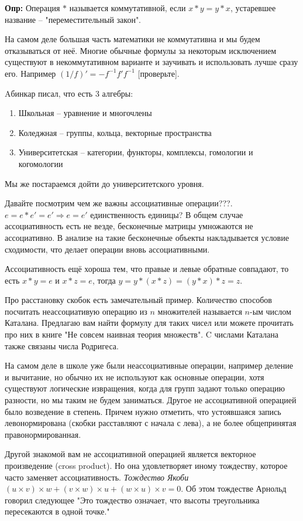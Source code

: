 \textbf{Опр:} Операция $*$ называется коммутативной, если $x*y=y*x$, устаревшее
название – "переместительный закон".

На самом деле большая часть математики не коммутативна и мы будем отказываться
от неё. Многие обычные формулы за некоторым исключением существуют в
некоммутативном варианте и заучивать и использовать лучше сразу его. Например
$(1/f)' = -f^{-1}f'f^{-1}$ [проверьте]. 

Aбинкар писал, что есть 3 алгебры:
\begin{enumerate}
    \item Школьная – уравнение и многочлены
    \item Коледжная – группы, кольца, векторные пространства
    \item Университетская – категории, функторы, комплексы, гомологии и когомологии
\end{enumerate}
Мы же постараемся дойти до университетского уровня.

Давайте посмотрим чем же важны ассоциативные операции???. $e = e*e' = e'
\Rightarrow e=e'$ единственность единицы? В общем случае ассоциативность
есть не везде, бесконечные матрицы умножаются не ассоциативно. В анализе на
такие бесконечные объекты накладывается условие сходимости, что делает операции
вновь ассоциативными.

Ассоциативность ещё хороша тем, что правые и левые обратные совпадают, то есть
$x*y=e$ и $x*z=e$, тогда $y=y*(x*z)=(y*x)*z=z$.

Про расстановку скобок есть замечательный пример. Количество способов посчитать
неассоциативую операцию из $n$ множителей называется $n$-ым числом Каталана.
Предлагаю вам найти формулу для таких чисел или можете прочитать про них в
книге "Не совсем наивная теория множеств". C числами Каталана также связаны
числа Родригеса.

На самом деле в школе уже были неассоциативные операции, например деление и
вычитание, но обычно их не используют как основные операции, хотя существуют
логические извращения, когда для групп задают только операцию разности, но мы
таким не будем заниматься. Другое не ассоциативной операцией было возведение в
степень. Причем нужно отметить, что устоявшаяся запись левонормирована (скобки
расставляют с начала с лева), а не более общепринятая правонормированная.

Другой знакомой вам не ассоциативной операцией является векторное произведение
(cross product). Но она удовлетворяет иному тождеству, которое часто заменяет
ассоциативность. \emph{Тождество Якоби} $(u\times v)\times w + (v\times w)
\times u+(w\times u)\times v = 0$. Об этом тождестве Арнольд говорил следующее
"Это тождество означает, что высоты треугольника пересекаются в одной точке."

